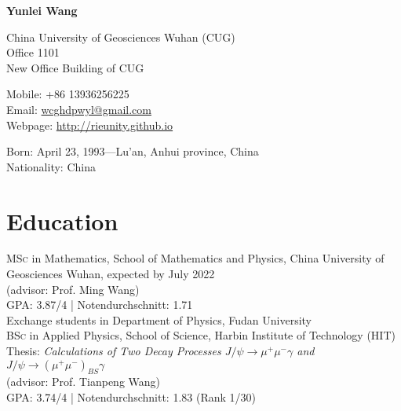 \documentclass[11pt]{article} %
\begin{document}

{\LARGE\bfseries Yunlei Wang} %
\bigskip\bigskip\medskip %

China University of Geosciences Wuhan (CUG)\\ %
Office 1101\\ New Office Building of CUG

\vspace{0.01\textheight} 

Mobile: +86 13936256225\\ %
Email: \href{wcghdpwyl@gmail.com}{wcghdpwyl@gmail.com}\\ %
Webpage: \href{http://rieunity.github.io}{http://rieunity.github.io}%

\vspace{0.01\textheight} %


Born: April 23, 1993---Lu'an, Anhui province, China\\ %
Nationality: China %


\section*{Education}

\textsc{MSc} in Mathematics, School of Mathematics and Physics, China University of Geosciences Wuhan, expected by July 2022\\
(advisor: Prof. Ming Wang)\\
GPA: 3.87/4 | Notendurchschnitt: 1.71 \\
 Exchange students in Department of Physics,  Fudan University\\
\textsc{BSc} in Applied Physics, School of Science, Harbin Institute of Technology (HIT)\\
Thesis: \emph{Calculations of Two Decay Processes $J /\psi \to \mu^+\mu^-\gamma$ and $J /\psi \to (\mu^+\mu^-)_{BS}\gamma$} \\
(advisor: Prof. Tianpeng Wang) \\
GPA: 3.74/4 | Notendurchschnitt: 1.83 (Rank 1/30)
\end{document}
